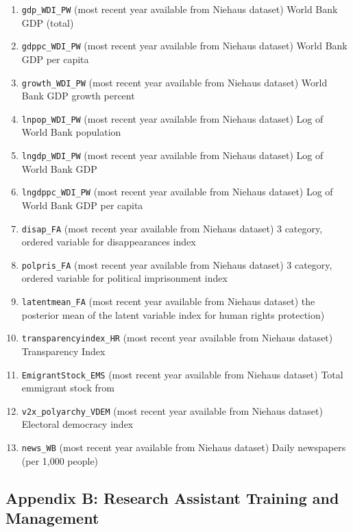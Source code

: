 \documentclass[]{article}
\begin{document}
\begin{enumerate}
\item
  \texttt{gdp\_WDI\_PW} (most recent year available from Niehaus dataset) World Bank GDP (total)
\item
  \texttt{gdppc\_WDI\_PW} (most recent year available from Niehaus dataset) World Bank GDP per capita
\item
  \texttt{growth\_WDI\_PW} (most recent year available from Niehaus dataset) World Bank GDP growth percent
\item
  \texttt{lnpop\_WDI\_PW} (most recent year available from Niehaus dataset) Log of World Bank population
\item
  \texttt{lngdp\_WDI\_PW} (most recent year available from Niehaus dataset) Log of World Bank GDP
\item
  \texttt{lngdppc\_WDI\_PW} (most recent year available from Niehaus dataset) Log of World Bank GDP per capita
\item
  \texttt{disap\_FA} (most recent year available from Niehaus dataset) 3 category, ordered variable for disappearances index
\item
  \texttt{polpris\_FA} (most recent year available from Niehaus dataset) 3 category, ordered variable for political imprisonment index
\item
  \texttt{latentmean\_FA} (most recent year available from Niehaus dataset) the posterior mean of the latent variable index for human rights protection)
\item
  \texttt{transparencyindex\_HR} (most recent year available from Niehaus dataset) Transparency Index
\item
  \texttt{EmigrantStock\_EMS} (most recent year available from Niehaus dataset) Total emmigrant stock from
\item
  \texttt{v2x\_polyarchy\_VDEM} (most recent year available from Niehaus dataset) Electoral democracy index
\item
  \texttt{news\_WB} (most recent year available from Niehaus dataset) Daily newspapers (per 1,000 people)
\end{enumerate}

\hypertarget{appendix-b-research-assistant-training-and-management}{%
\subsection*{Appendix B: Research Assistant Training and Management}\label{appendix-b-research-assistant-training-and-management}}
\end{document}

